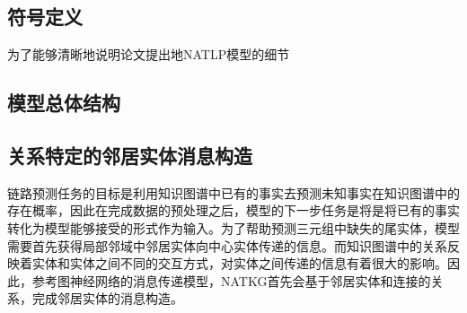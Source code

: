 \subsection{符号定义}

为了能够清晰地说明论文提出地NATLP模型的细节

\subsection{模型总体结构}

\subsection{关系特定的邻居实体消息构造}

链路预测任务的目标是利用知识图谱中已有的事实去预测未知事实在知识图谱中的存在概率，因此在完成数据的预处理之后，模型的下一步任务是将是将已有的事实转化为模型能够接受的形式作为输入。为了帮助预测三元组中缺失的尾实体，模型需要首先获得局部邻域中邻居实体向中心实体传递的信息。而知识图谱中的关系反映着实体和实体之间不同的交互方式，对实体之间传递的信息有着很大的影响。因此，参考图神经网络的消息传递模型，NATKG首先会基于邻居实体和连接的关系，完成邻居实体的消息构造。

